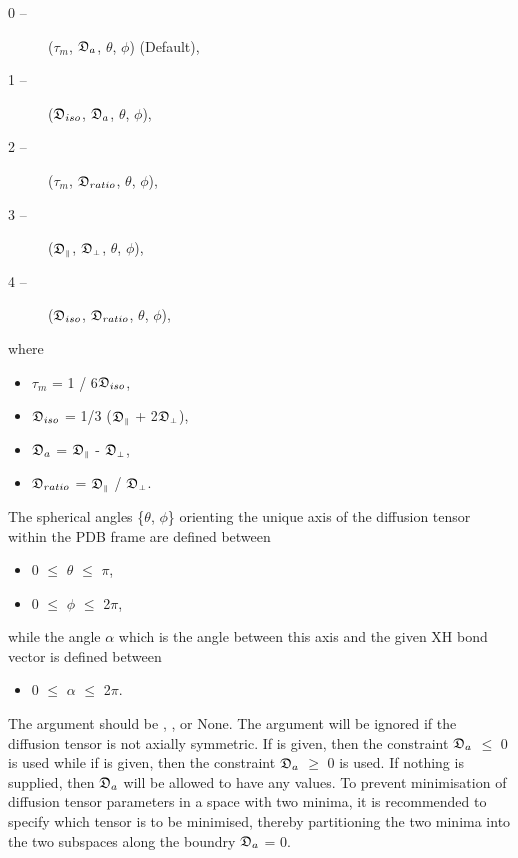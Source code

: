 \begin{description}
\item[0 --]  ($\tau_m$, $\mathfrak{D}_a$, $\theta$, $\phi$)   (Default), 
\item[1 --]  ($\mathfrak{D}_{iso}$, $\mathfrak{D}_a$, $\theta$, $\phi$), 
\item[2 --]  ($\tau_m$, $\mathfrak{D}_{ratio}$, $\theta$, $\phi$), 
\item[3 --]  ($\mathfrak{D}_{\scriptscriptstyle \parallel}$, $\mathfrak{D}_{\scriptscriptstyle \perp}$, $\theta$, $\phi$), 
\item[4 --]  ($\mathfrak{D}_{iso}$, $\mathfrak{D}_{ratio}$, $\theta$, $\phi$), 
\end{description}


where


\begin{itemize}
\item[] $\tau_m$ = 1 / 6$\mathfrak{D}_{iso}$, 
\item[] $\mathfrak{D}_{iso}$ = 1/3 ($\mathfrak{D}_{\scriptscriptstyle \parallel}$ + 2$\mathfrak{D}_{\scriptscriptstyle \perp}$), 
\item[] $\mathfrak{D}_a$ = $\mathfrak{D}_{\scriptscriptstyle \parallel}$ - $\mathfrak{D}_{\scriptscriptstyle \perp}$, 
\item[] $\mathfrak{D}_{ratio}$ = $\mathfrak{D}_{\scriptscriptstyle \parallel}$ / $\mathfrak{D}_{\scriptscriptstyle \perp}$. 
\end{itemize}


The spherical angles \{$\theta$, $\phi$\} orienting the unique axis of the diffusion tensor within the PDB frame are defined between


\begin{itemize}
\item[] 0 $\le$ $\theta$ $\le$ $\pi$, 
\item[] 0 $\le$ $\phi$ $\le$ 2$\pi$, 
\end{itemize}


while the angle $\alpha$ which is the angle between this axis and the given XH bond vector is defined between


\begin{itemize}
\item[] 0 $\le$ $\alpha$ $\le$ 2$\pi$. 
\end{itemize}


The  argument should be , , or None.  The argument will be ignored if the diffusion tensor is not axially symmetric.  If  is given, then the constraint $\mathfrak{D}_a$ $\le$ 0 is used while if  is given, then the constraint $\mathfrak{D}_a$ $\ge$ 0 is used.  If nothing is supplied, then $\mathfrak{D}_a$ will be allowed to have any values.  To prevent minimisation of diffusion tensor parameters in a space with two minima, it is recommended to specify which tensor is to be minimised, thereby partitioning the two minima into the two subspaces along the boundry $\mathfrak{D}_a$ = 0.




